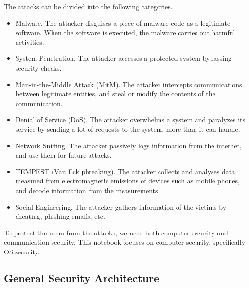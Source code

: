 The attacks can be divided into the following categories.
\begin{itemize}
	\item Malware. The attacker disguises a piece of malware code as a legitimate software. When the software is executed, the malware carries out harmful activities.
	\item System Penetration. The attacker accesses a protected system bypassing security checks.
	\item Man-in-the-Middle Attack (MitM). The attacker intercepts communications between legitimate entities, and steal or modify the contents of the communication.
	\item Denial of Service (DoS). The attacker overwhelms a system and paralyzes its service by sending a lot of requests to the system, more than it can handle.
	\item Network Sniffing. The attacker passively logs information from the internet, and use them for future attacks.
	\item TEMPEST (Van Eck phreaking). The attacker collects and analyses data measured from electromagnetic emissions of devices such as mobile phones, and decode information from the measurements.
	\item Social Engineering. The attacker gathers information of the victims by cheating, phishing emails, etc.
\end{itemize}

To protect the users from the attacks, we need both computer security and communication security. This notebook focuses on computer security, specifically OS security.

\subsection{General Security Architecture}

